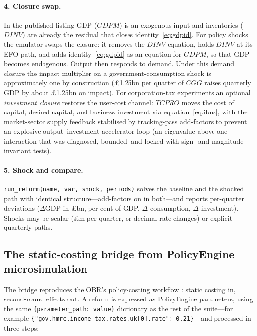\paragraph{4. Closure swap.} In the published listing GDP ($GDPM$) is an exogenous input and inventories ($DINV$) are already the residual that closes identity~\eqref{eq:gdpid}. For policy shocks the emulator swaps the closure: it removes the $DINV$ equation, holds $DINV$ at its EFO path, and adds identity~\eqref{eq:gdpid} as an equation for $GDPM$, so that GDP becomes endogenous. Output then responds to demand. Under this demand closure the impact multiplier on a government-consumption shock is approximately one by construction (\pounds 1.25bn per quarter of $CGG$ raises quarterly GDP by about \pounds 1.25bn on impact). For corporation-tax experiments an optional \emph{investment closure} restores the user-cost channel: $TCPRO$ moves the cost of capital, desired capital, and business investment via equation~\eqref{eq:ibus}, with the market-sector supply feedback stabilised by tracking-pass add-factors to prevent an explosive output--investment accelerator loop (an eigenvalue-above-one interaction that was diagnosed, bounded, and locked with sign- and magnitude-invariant tests).

\paragraph{5. Shock and compare.} \texttt{run\_reform(name, var, shock, periods)} solves the baseline and the shocked path with identical structure---add-factors on in both---and reports per-quarter deviations ($\Delta$GDP in \pounds bn, per cent of GDP, $\Delta$ consumption, $\Delta$ investment). Shocks may be scalar (\pounds m per quarter, or decimal rate changes) or explicit quarterly paths.

\subsection{The static-costing bridge from PolicyEngine microsimulation}
\label{sec:bridge}

The bridge reproduces the OBR's policy-costing workflow \citep{obr2014costings}: static costing in, second-round effects out. A reform is expressed as PolicyEngine parameters, using the same \texttt{\{parameter\_path:\allowbreak\ value\}} dictionary as the rest of the suite---for example \texttt{\{"gov.hmrc.\allowbreak income\_tax.\allowbreak rates.\allowbreak uk[0].\allowbreak rate":\allowbreak\ 0.21\}}---and processed in three steps:

